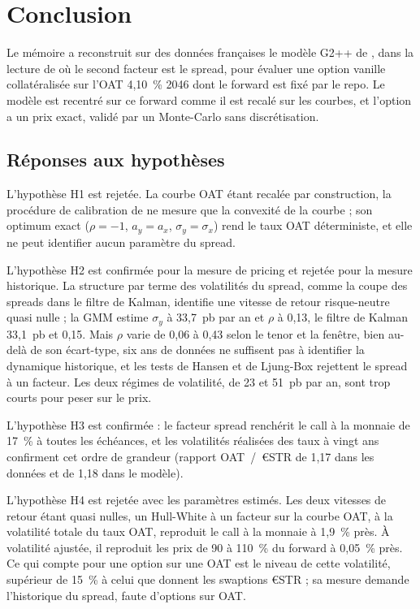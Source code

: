 \section*{Conclusion}

Le mémoire a reconstruit sur des données françaises le modèle G2++ de \citet{BrigoMercurio2006}, dans la lecture
de \citet{Russo} où le second facteur est le spread, pour évaluer une option vanille collatéralisée sur l'OAT
4,10~\% 2046 dont le forward est fixé par le repo. Le modèle est recentré sur ce forward comme il est recalé sur
les courbes, et l'option a un prix exact, validé par un Monte-Carlo sans discrétisation.

\subsection*{Réponses aux hypothèses}

L'hypothèse H1 est rejetée. La courbe OAT étant recalée par construction, la procédure de calibration de
\citet{Russo} ne mesure que la convexité de la courbe ; son optimum exact ($\rho = -1$, $a_y = a_x$,
$\sigma_y = \sigma_x$) rend le taux OAT déterministe, et elle ne peut identifier aucun paramètre du spread.

L'hypothèse H2 est confirmée pour la mesure de pricing et rejetée pour la mesure historique. La structure par
terme des volatilités du spread, comme la coupe des spreads dans le filtre de Kalman, identifie une vitesse de
retour risque-neutre quasi nulle ; la GMM estime $\sigma_y$ à 33,7~pb par an et $\rho$ à 0,13, le filtre de Kalman
33,1~pb et 0,15. Mais $\rho$ varie de 0,06 à 0,43 selon le tenor et la fenêtre, bien au-delà de son écart-type, six
ans de données ne suffisent pas à identifier la dynamique historique, et les tests de Hansen et de Ljung-Box
rejettent le spread à un facteur. Les deux régimes de volatilité, de 23 et 51~pb par an, sont trop courts pour
peser sur le prix.

L'hypothèse H3 est confirmée : le facteur spread renchérit le call à la monnaie de 17~\% à toutes les échéances,
et les volatilités réalisées des taux à vingt ans confirment cet ordre de grandeur (rapport OAT~/~€STR de 1,17 dans
les données et de 1,18 dans le modèle).

L'hypothèse H4 est rejetée avec les paramètres estimés. Les deux vitesses de retour étant quasi nulles, un
Hull-White à un facteur sur la courbe OAT, à la volatilité totale du taux OAT, reproduit le call à la monnaie à
1,9~\% près. À volatilité ajustée, il reproduit les prix de 90 à 110~\% du forward à 0,05~\% près. Ce qui compte pour une
option sur une OAT est le niveau de cette volatilité, supérieur de 15~\% à celui que donnent les swaptions €STR ;
sa mesure demande l'historique du spread, faute d'options sur OAT.

